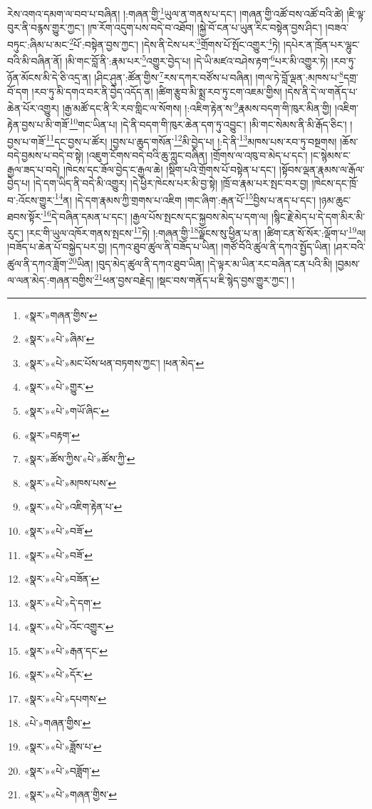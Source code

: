 རེས་འགའ་དམག་ལ་བབ་པ་བཞིན། །:གཞན་གྱི་\footnote{«སྣར་»གཞན་གྱིས་}ཡུལ་ན་གནས་པ་དང་། །གཞན་གྱི་འཚོ་བས་འཚོ་བའི་ཚེ། །ཇི་ལྟ་བུར་ནི་བརྙས་གྱུར་ཀྱང་། །ཁ་རོག་འདུག་པས་བདེ་བ་འཐོབ། །སྐྱེ་བོ་ངན་པ་ཡུན་རིང་བསྟེན་བྱས་ཤིང་། །བཟའ་བཏུང་:ཞིམ་པ་མང་\footnote{«སྣར་»«པེ་»ཞིམ་}པོ་:བསྟེན་བྱས་ཀྱང་། །དེས་ནི་ངེས་པར་\footnote{«སྣར་»«པེ་»མང་པོས་ཕན་བཏགས་ཀྱང་། །ཕན་མེད་}གྲོགས་པོ་སྤོང་འགྱུར་\footnote{«སྣར་»«པེ་»གྱུར་}ཏེ། །དཔེར་ན་ཁྲོན་པར་ལྷུང་བའི་མི་བཞིན་ནོ། །མི་གང་བློ་ནི་:རྣམ་པར་\footnote{«སྣར་»«པེ་»གཡོ་ཞིང་}འགྱུར་བྱེད་པ། །དེ་ཡི་མཛའ་བཤེས་རྟག་\footnote{«སྣར་»བརྟག་}པར་མི་འགྱུར་ཏེ། །རབ་ཏུ་ཉོན་མོངས་མི་དེ་ཅི་འདྲ་ན། །ཤིང་ཤུན་:ཚོན་གྱིས་\footnote{«སྣར་»ཚོས་ཀྱིས་«པེ་»ཚོས་ཀྱི་}རས་དཀར་བཙོས་པ་བཞིན། །གལ་ཏེ་བློ་ལྡན་:མཁས་པ་\footnote{«སྣར་»«པེ་»མཁས་པས་}དགྲ་བོ་དག །རབ་ཏུ་མི་དགའ་བར་ནི་བྱེད་འདོད་ན། །ཚིག་རྩུབ་མི་སྨྲ་རབ་ཏུ་ངག་འཇམ་གྱིས། །དེས་ནི་དེ་ལ་གནོད་པ་ཆེན་པོར་འགྱུར། །རྒྱ་མཚོ་དང་ནི་རི་རབ་གླིང་ལ་སོགས། །:འཇིག་རྟེན་ས་\footnote{«སྣར་»«པེ་»འཇིག་རྟེན་པ་}རྣམས་བདག་གི་ཁུར་མིན་གྱི། །འཇིག་རྟེན་བྱས་པ་མི་གཟོ་\footnote{«སྣར་»«པེ་»བཟོ་}གང་ཡིན་པ། །དེ་ནི་བདག་གི་ཁུར་ཆེན་དག་ཏུ་འབྱུང་། །མི་གང་སེམས་ནི་མི་རྒོད་ཅིང་། །བྱས་པ་གཟོ་\footnote{«སྣར་»«པེ་»བཟོ་}དང་བྱས་པ་ཚོར། །བྱས་པ་ཆུད་གསོན་\footnote{«སྣར་»«པེ་»བཟོན་}མི་བྱེད་པ། །:དེ་ནི་\footnote{«སྣར་»«པེ་»དེ་དག་}མཁས་པས་རབ་ཏུ་བསྔགས། །ཆོས་བདེ་བྱམས་པ་བདེ་བ་སྟེ། །འཇུག་ངོགས་བདེ་བའི་ཆུ་ཀླུང་བཞིན། །གྲོགས་ལ་འཁུ་བ་མེད་པ་དང་། །ང་སྙེམས་ང་རྒྱལ་ཟད་པ་བདེ། །ཁེངས་དང་ཟོལ་བྱེད་ང་རྒྱལ་ཆེ། །སྡིག་པའི་གྲོགས་པོ་བསྟེན་པ་དང་། །སྟོབས་ལྡན་རྣམས་ལ་རྒོལ་བྱེད་པ། །དེ་དག་ཡིད་ནི་བདེ་མི་འགྱུར། །དེ་ཕྱིར་ཁེངས་པར་མི་བྱ་སྟེ། །ཁྲོ་བ་རྣམ་པར་སྤང་བར་བྱ། །ཁེངས་དང་ཁྲོ་བ་:འོངས་གྱུར་\footnote{«སྣར་»«པེ་»འོང་འགྱུར་}ན། །དེ་དག་རྣམས་ཀྱི་གྲགས་པ་འཇིག །གང་ཞིག་:རྒན་པོ་\footnote{«སྣར་»«པེ་»རྒན་དང་}བྱིས་པ་ནད་པ་དང་། །ཉམ་ཆུང་ཐབས་སྟོར་\footnote{«སྣར་»«པེ་»དོར་}དེ་བཞིན་དམན་པ་དང་། །རྒྱལ་པོས་སྤངས་དང་སྐྱབས་མེད་པ་དག་ལ། །སྙིང་རྗེ་མེད་པ་དེ་དག་མིར་མི་རུང་། །རང་གི་ཡུལ་འཁོར་གནས་སྤངས་\footnote{«སྣར་»«པེ་»དཔགས་}ཏེ། །:གཞན་གྱི་\footnote{«པེ་»གཞན་གྱིས་}ལྗོངས་སུ་ཕྱིན་པ་ན། །ཚིག་ངན་སོ་སོར་:ལྡོག་པ་\footnote{«སྣར་»«པེ་»ཟློས་པ་}ལ། །བཟོད་པ་ཆེན་པོ་བསྐྱེད་པར་བྱ། །དཀའ་ཐུབ་ཚུལ་ནི་བཟོད་པ་ཡིན། །གཙོ་བོའི་ཚུལ་ནི་དཀའ་སྤྱོད་ཡིན། །ཤར་བའི་ཚུལ་ནི་དཀའ་ཟློག་\footnote{«སྣར་»«པེ་»བཟློག་}ཡིན། །བུད་མེད་ཚུལ་ནི་དཀའ་ཐུབ་ཡིན། །དེ་ལྟར་མ་ཡིན་རང་བཞིན་ངན་པའི་མི། །བྱམས་ལ་ལན་མེད་:གཞན་བགྱིས་\footnote{«སྣར་»«པེ་»གཞན་གྱིས་}ཕན་བྱས་བརྗེད། །སྡང་བས་གནོད་པ་ཇི་སྙེད་བྱས་གྱུར་ཀྱང་། །
